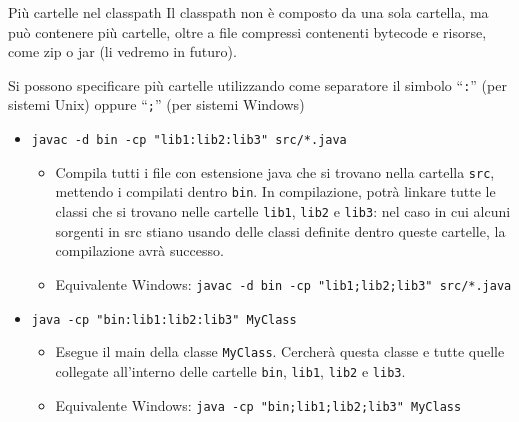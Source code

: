 \documentclass[xcolor=dvipsnames,presentation]{beamer}
\begin{document}
\begin{frame}{Più cartelle nel classpath}
	Il classpath non è composto da una sola cartella, ma può contenere più cartelle, oltre a file compressi contenenti bytecode e risorse, come zip o jar (li vedremo in futuro).
	\begin{block}{}
		Si possono specificare più cartelle utilizzando come separatore il simbolo ``\texttt{:}'' (per sistemi Unix) oppure ``\texttt{;}'' (per sistemi Windows)
		\begin{itemize}
			\item \texttt{javac -d bin -cp "lib1:lib2:lib3" src/*.java}
			\begin{itemize}
				\item Compila tutti i file con estensione java che si trovano nella cartella \texttt{src}, mettendo i compilati dentro \texttt{bin}. In compilazione, potrà linkare tutte le classi che si trovano nelle cartelle \texttt{lib1}, \texttt{lib2} e \texttt{lib3}: nel caso in cui alcuni sorgenti in src stiano usando delle classi definite dentro queste cartelle, la compilazione avrà successo.
				\item \scriptsize{Equivalente Windows: \texttt{javac -d bin -cp "lib1;lib2;lib3" src/*.java}}
		\end{itemize}
			\item \texttt{java -cp "bin:lib1:lib2:lib3" MyClass}
			\begin{itemize}
				\item Esegue il main della classe \texttt{MyClass}. Cercherà questa classe e tutte quelle collegate all'interno delle cartelle \texttt{bin}, \texttt{lib1}, \texttt{lib2} e \texttt{lib3}.
				\item \scriptsize{Equivalente Windows: \texttt{java -cp "bin;lib1;lib2;lib3" MyClass}}
			\end{itemize}
		\end{itemize}
	\end{block}
\end{frame}
\end{document}
